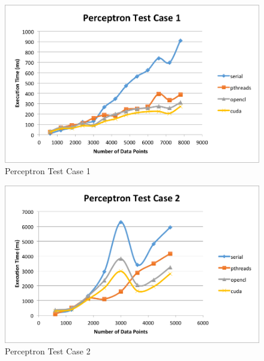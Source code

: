 \documentclass{article}
\begin{document}
\begin{figure}[!htbp]
\begin{center}
\includegraphics[width=1.0\textwidth]{PerceptronTestCase1} %
\caption{Perceptron Test Case 1}
\end{center}
\end{figure}
\clearpage
\begin{figure}[!htbp]
\begin{center}
\includegraphics[width=1.0\textwidth]{PerceptronTestCase2} %
\caption{Perceptron Test Case 2}
\end{center}
\end{figure}
\end{document}
